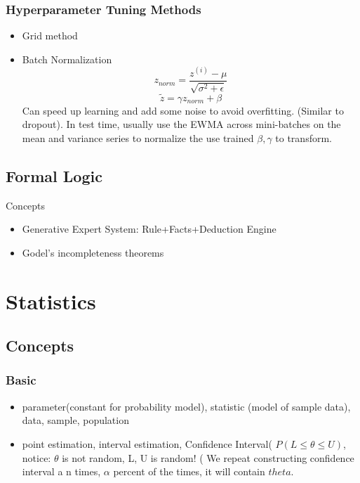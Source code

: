 \documentclass[11pt, openany]{book}              %
\begin{document}
\subsection{Hyperparameter Tuning Methods}

\begin{itemize}
	\item Grid method 
	\item Batch Normalization 
	$$z_{norm} = \frac{z^{(i)}-\mu}{\sqrt{\sigma^2 + \epsilon}}$$
	$$\tilde{z} = \gamma z_{norm}  + \beta$$
	Can speed up learning and add some noise to avoid overfitting. (Similar to dropout).
	In test time, usually use the EWMA across mini-batches on the mean and variance series to normalize the use trained $\beta, \gamma$ to transform. 
\end{itemize}

\section{Formal Logic}

Concepts
\begin{itemize}
    \item Generative Expert System: Rule+Facts+Deduction Engine 
    \item Godel's incompleteness theorems
\end{itemize}

\chapter{Statistics}

\section{Concepts}
\subsection{Basic}
\begin{itemize}
    \item parameter(constant for probability model), statistic (model of sample data), data, sample, population
    \item point estimation, interval estimation, Confidence Interval( $P(L \leq \theta \leq U )$, notice: $\theta$ is not random, L, U is random! ( We repeat constructing confidence interval a n times, $\alpha$ percent of the times, it will contain $theta$.
\end{itemize}
\end{document}
